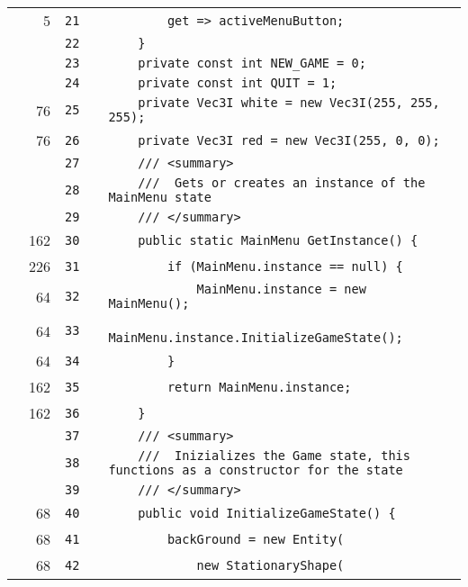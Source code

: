 \documentclass[a4paper,landscape,10pt]{article}
\begin{document}
\begin{longtable}[l]{lrrll}
\cellcolor{green} & 5 & \verb~21~ & & \verb~        get => activeMenuButton;~\\
\cellcolor{gray} &  & \verb~22~ & & \verb~    }~\\
\cellcolor{gray} &  & \verb~23~ & & \verb~    private const int NEW_GAME = 0;~\\
\cellcolor{gray} &  & \verb~24~ & & \verb~    private const int QUIT = 1;~\\
\cellcolor{green} & 76 & \verb~25~ & & \verb~    private Vec3I white = new Vec3I(255, 255, 255);~\\
\cellcolor{green} & 76 & \verb~26~ & & \verb~    private Vec3I red = new Vec3I(255, 0, 0);~\\
\cellcolor{gray} &  & \verb~27~ & & \verb~    /// <summary>~\\
\cellcolor{gray} &  & \verb~28~ & & \verb~    ///  Gets or creates an instance of the MainMenu state~\\
\cellcolor{gray} &  & \verb~29~ & & \verb~    /// </summary>~\\
\cellcolor{green} & 162 & \verb~30~ & & \verb~    public static MainMenu GetInstance() {~\\
\cellcolor{green} & 226 & \verb~31~ & & \verb~        if (MainMenu.instance == null) {~\\
\cellcolor{green} & 64 & \verb~32~ & & \verb~            MainMenu.instance = new MainMenu();~\\
\cellcolor{green} & 64 & \verb~33~ & & \verb~            MainMenu.instance.InitializeGameState();~\\
\cellcolor{green} & 64 & \verb~34~ & & \verb~        }~\\
\cellcolor{green} & 162 & \verb~35~ & & \verb~        return MainMenu.instance;~\\
\cellcolor{green} & 162 & \verb~36~ & & \verb~    }~\\
\cellcolor{gray} &  & \verb~37~ & & \verb~    /// <summary>~\\
\cellcolor{gray} &  & \verb~38~ & & \verb~    ///  Inizializes the Game state, this functions as a constructor for the state~\\
\cellcolor{gray} &  & \verb~39~ & & \verb~    /// </summary>~\\
\cellcolor{green} & 68 & \verb~40~ & & \verb~    public void InitializeGameState() {~\\
\cellcolor{green} & 68 & \verb~41~ & & \verb~        backGround = new Entity(~\\
\cellcolor{green} & 68 & \verb~42~ & & \verb~            new StationaryShape(~\\

\end{longtable}
\end{document}
